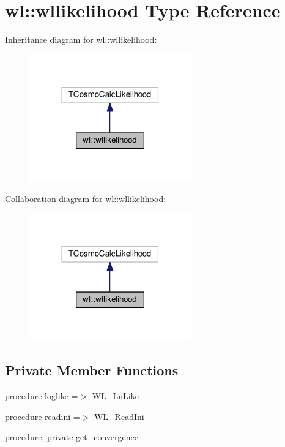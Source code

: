 \hypertarget{structwl_1_1wllikelihood}{}\section{wl\+:\+:wllikelihood Type Reference}
\label{structwl_1_1wllikelihood}


Inheritance diagram for wl\+:\+:wllikelihood\+:
\nopagebreak
\begin{figure}[H]
\begin{center}
\leavevmode
\includegraphics[width=198pt]{structwl_1_1wllikelihood__inherit__graph}
\end{center}
\end{figure}


Collaboration diagram for wl\+:\+:wllikelihood\+:
\nopagebreak
\begin{figure}[H]
\begin{center}
\leavevmode
\includegraphics[width=198pt]{structwl_1_1wllikelihood__coll__graph}
\end{center}
\end{figure}
\subsection*{Private Member Functions}
\begin{DoxyCompactItemize}
\item 
procedure \mbox{\hyperlink{structwl_1_1wllikelihood_a40cc5b8116c8da58fc3605fc83ac3c7b}{loglike}} =$>$ W\+L\+\_\+\+Ln\+Like
\item 
procedure \mbox{\hyperlink{structwl_1_1wllikelihood_a1952a1f37ed036397786170da28a71e9}{readini}} =$>$ W\+L\+\_\+\+Read\+Ini
\item 
procedure, private \mbox{\hyperlink{structwl_1_1wllikelihood_aff83b8f5d3ccb318cedfa679b62e48fa}{get\+\_\+convergence}}
\end{DoxyCompactItemize}
